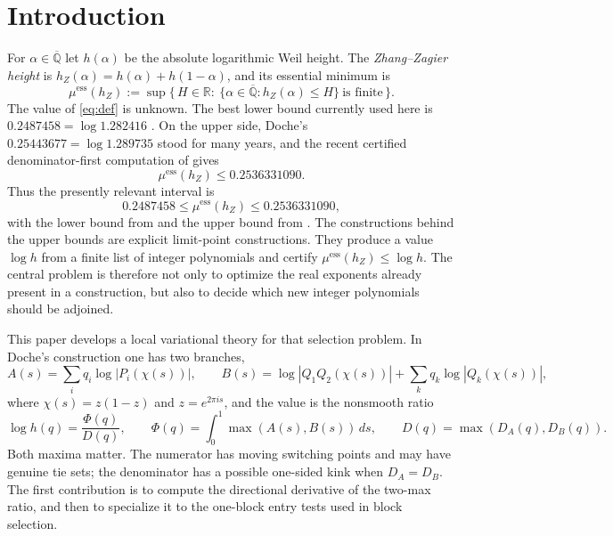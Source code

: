 \documentclass[11pt,reqno]{amsart}
\theoremstyle{plain}
\theoremstyle{definition}
\theoremstyle{remark}
\newcommand{\Q}{\mathbb{Q}}
\newcommand{\R}{\mathbb{R}}
\newcommand{\Qbar}{\overline{\Q}}
\newcommand{\hZ}{h_Z}
\newcommand{\essmin}{\mu^{\mathrm{ess}}(\hZ)}
\newcommand{\dA}{D_A}
\newcommand{\dB}{D_B}
\begin{document}
\maketitle

\section{Introduction}\label{sec:intro}

For $\alpha\in\Qbar$ let $h(\alpha)$ be the absolute logarithmic Weil height.  The
\emph{Zhang--Zagier height} \citep{Zha95,Zag93} is
$\hZ(\alpha)=h(\alpha)+h(1-\alpha)$, and its essential minimum is
\begin{equation}\label{eq:def}
  \essmin:=\sup\bigl\{\,H\in\R:\ \{\alpha\in\Qbar:\hZ(\alpha)\le H\}\ \text{is finite}\,\bigr\}.
\end{equation}
The value of \eqref{eq:def} is unknown.  The best lower bound currently used here is
$0.2487458=\log 1.282416$ \citep{F18}.  On the upper side, Doche's
$0.25443677=\log 1.289735$ \citep{Doc01b} stood for many years, and the recent certified denominator-first computation of \citet{Gri26} gives
\[
  \essmin\le 0.2536331090.
\]
Thus the presently relevant interval is
\[
  0.2487458\le\essmin\le0.2536331090,
\]
with the lower bound from \citet{F18} and the upper bound from \citet{Gri26}.
The constructions behind the upper bounds are explicit limit-point constructions.
They produce a value $\log h$ from a finite list of integer polynomials and certify
$\essmin\le\log h$.  The central problem is therefore not only to optimize the real
exponents already present in a construction, but also to decide which new integer
polynomials should be adjoined.

This paper develops a local variational theory for that selection problem.  In
Doche's construction one has two branches,
\[
  A(s)=\sum_i q_i\log|P_i(\chi(s))|,\qquad
  B(s)=\log|Q_1Q_2(\chi(s))|+\sum_k q_k\log|Q_k(\chi(s))|,
\]
where $\chi(s)=z(1-z)$ and $z=e^{2\pi i s}$, and the value is the nonsmooth ratio
\begin{equation}\label{eq:ratio}
  \log h(q)=\frac{\Phi(q)}{D(q)},\qquad
  \Phi(q)=\int_0^1\max(A(s),B(s))\,ds,
  \qquad D(q)=\max(\dA(q),\dB(q)).
\end{equation}
Both maxima matter.  The numerator has moving switching points and may have genuine
tie sets; the denominator has a possible one-sided kink when $\dA=\dB$.  The first
contribution is to compute the directional derivative of the two-max ratio, and then to
specialize it to the one-block entry tests used in block selection.
\end{document}
